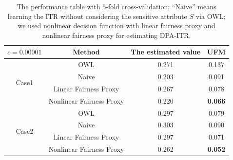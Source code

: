 \documentclass[12pt]{article}
\theoremstyle{plain}
\theoremstyle{definition}
\theoremstyle{remark}
\begin{document}
\begin{table}
 \caption{  The performance table with $5$-fold cross-validation; ``Naive'' means learning the ITR without considering the sensitive attribute $S$ via OWL;  we used nonlinear decision function with linear  fairness proxy and nonlinear  fairness proxy for estimating DPA-ITR.}
 \centering
{\begin{tabular}{cccc}
  \toprule
    $c=0.00001$ & Method  & The estimated value & UFM \\
      \midrule
    \multirow{4}{*}{Case1 } & OWL  & 0.271 &0.137   \\
   & Naive  & 0.203& 0.091\\
      & Linear  Fairness Proxy  & 0.267& 0.078\\
      & Nonlinear  Fairness Proxy  & 0.220& \textbf{0.066}\\
     \midrule
    \multirow{4}{*}{Case2 } & OWL  & 0.297 &0.079 \\
   & Naive  & 0.303& 0.090\\
      & Linear Fairness Proxy  & 0.297& 0.071\\
      & Nonlinear Fairness  Proxy  & 0.262& \textbf{0.052}\\
  \bottomrule
\end{tabular}}
 \label{table2}

\end{table}



\end{document}
